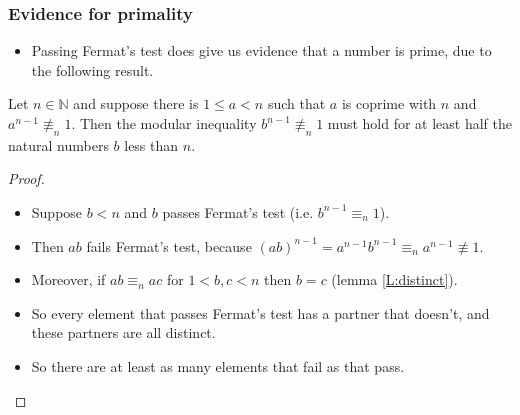 \documentclass[handout]{beamer}
\newcommand{\bN}{\mathbb{N}}
\begin{document}
\begin{frame}
\frametitle{Evidence for primality}
\begin{itemize}
\item Passing Fermat's test does give us evidence that a number is prime, due to the following result.
\end{itemize}
\begin{lemma}\label{L:half}
Let $n\in \bN$ and suppose there is $1\leq a<n$ such that $a$ is coprime with $n$ and $a^{n-1}\not\equiv_n 1$. Then the modular inequality $b^{n-1}\not\equiv_n 1$ must hold for at least half the natural numbers $b$ less than $n$. 
\end{lemma} 
\begin{proof}
\begin{itemize}
\item Suppose $b<n$ and $b$ passes Fermat's test (i.e. $b^{n-1}\equiv_n 1$). 
\item Then $ab$ fails Fermat's test, because $(ab)^{n-1} = a^{n-1}b^{n-1}\equiv_n a^{n-1}\not\equiv 1$. 
\item Moreover, if $ab\equiv_n ac$ for $1<b,c< n$ then $b=c$ (lemma \ref{L:distinct}). 
\item So every element that passes Fermat's test has a partner that doesn't, and these partners are all distinct.
\item So there are at least as many elements that fail as that pass. 
\end{itemize}
\end{proof}
\end{frame}
\end{document}
